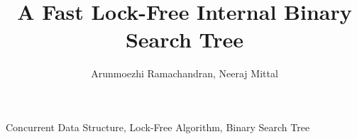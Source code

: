 \documentclass{llncs}
\begin{document}
\title{A Fast Lock-Free Internal Binary Search Tree}

\author{Arunmoezhi Ramachandran, Neeraj Mittal}


\maketitle



\keywords
Concurrent Data Structure, Lock-Free Algorithm, Binary Search Tree













\end{document}

